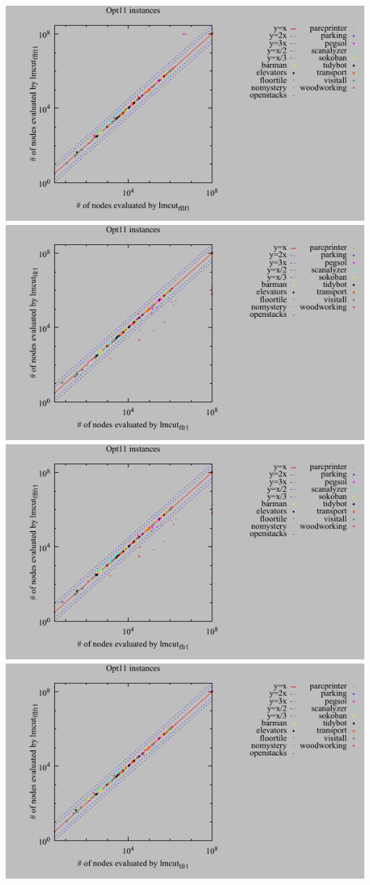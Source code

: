 \includegraphics{tables/opt11-evaluated-lmcut_fflf-lmcut_fflfr.pdf}
\linebreak
\includegraphics{tables/opt11-evaluated-lmcut_ffr-lmcut_lfr.pdf}
\linebreak
\includegraphics{tables/opt11-evaluated-lmcut_ffr-lmcut_fflfr.pdf}
\linebreak
\includegraphics{tables/opt11-evaluated-lmcut_lfr-lmcut_fflfr.pdf}
\linebreak
